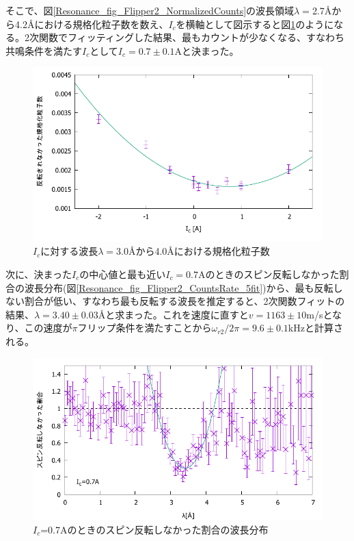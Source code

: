 そこで、図\ref{Resonance_fig_Flipper2_NormalizedCounts}の波長領域$\lambda=$2.7{\AA}から4.2{\AA}における規格化粒子数を数え、$I_c$を横軸として図示すると図\ref{Resonance_fig_Flipper2_Cur}のようになる。2次関数でフィッティングした結果、最もカウントが少なくなる、すなわち共鳴条件を満たす$I_c$として$I_c=0.7\pm0.1$Aと決まった。
\begin{figure}[h]
\centering
\includegraphics[width=12cm]{resonance/analysis/Flipper2_Cur_30-40.pdf}
\caption{$I_c$に対する波長$\lambda=$3.0{\AA}から4.0{\AA}における規格化粒子数}\label{Resonance_fig_Flipper2_Cur}
\end{figure}

次に、決まった$I_c$の中心値と最も近い$I_c=0.7$Aのときのスピン反転しなかった割合の波長分布(図\ref{Resonance_fig_Flipper2_CountsRate_5fit})から、最も反転しない割合が低い、すなわち最も反転する波長を推定すると、2次関数フィットの結果、$\lambda=3.40\pm0.03${\AA}と求まった。これを速度に直すと$v=1163\pm10$m/sとなり、この速度が$\pi$フリップ条件を満たすことから$\omega_{r2}/2\pi=9.6\pm0.1$kHzと計算される。
\begin{figure}[h]
\centering
\includegraphics[width=12cm]{resonance/analysis/Flipper2_CountsRate_7A_fit.pdf}
\caption{$I_c$=0.7Aのときのスピン反転しなかった割合の波長分布}\label{Resonance_fig_Flipper2_CountsRate_7fit}
\end{figure}

